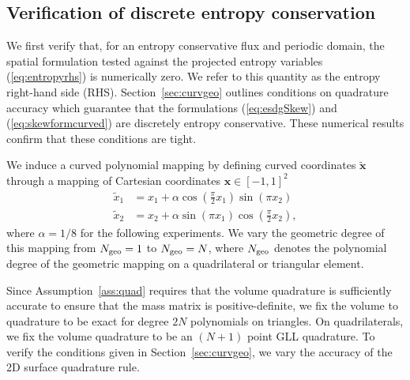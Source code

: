 \documentclass{svjour3}                     %
\renewcommand{\tilde}{\widetilde}
\newcommand{\LRp}[1]{\left( #1 \right)}
\renewcommand{\note}[1]{{\color{blue}{#1}}}
\begin{document}

\subsection{Verification of discrete entropy conservation}

We first verify that, for an entropy conservative flux and periodic domain, the spatial formulation tested against the projected entropy variables (\ref{eq:entropyrhs}) is numerically zero.  We refer to this quantity as the entropy right-hand side (RHS).   Section~\ref{sec:curvgeo} outlines conditions on quadrature accuracy which guarantee that the formulations (\ref{eq:esdgSkew}) and (\ref{eq:skewformcurved}) are discretely entropy conservative.  These numerical results confirm that these conditions are tight.  

We induce a curved polynomial mapping by defining curved coordinates $\tilde{\bm{x}}$ through a mapping of Cartesian coordinates $\bm{x} \in [-1,1]^2$ 
\begin{align*}
\tilde{x}_1 &= x_1 + \alpha \cos\LRp{\frac{\pi}{2}x_1}\sin\LRp{\pi x_2}\\
\tilde{x}_2 &= x_2 + \alpha \sin\LRp{{\pi}x_1}\cos\LRp{\frac{\pi}{2} x_2},
\end{align*}
where $\alpha = 1/8$ for the following experiments.  We vary the geometric degree of this mapping from $N_{\rm geo} = 1$ to $N_{\rm geo} = N$, where $N_{\rm geo}$ denotes the polynomial degree of the geometric mapping on a quadrilateral or triangular element.  

Since Assumption~\ref{ass:quad} requires that the volume quadrature is sufficiently accurate to ensure that the mass matrix is positive-definite, we fix the volume to quadrature to be exact for degree $2N$ polynomials on triangles.  On quadrilaterals, we fix the volume quadrature to be an $(N+1)$ point GLL quadrature.  To verify the conditions given in Section~\ref{sec:curvgeo}, we vary the accuracy of the 2D surface quadrature rule.  
\end{document}
